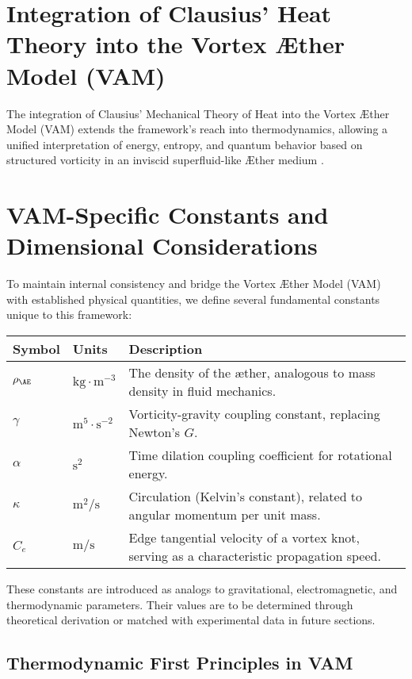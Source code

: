 

\section{Integration of Clausius' Heat Theory into the Vortex \AE ther Model (VAM)}

The integration of Clausius' Mechanical Theory of Heat into the Vortex \AE ther Model (VAM) extends the framework's reach into thermodynamics, allowing a unified interpretation of energy, entropy, and quantum behavior based on structured vorticity in an inviscid superfluid-like \AE ther medium \cite{clausius1865mechanical, maxwell1865electromagnetic, helmholtz1858integrals}.

\section{VAM-Specific Constants and Dimensional Considerations}

To maintain internal consistency and bridge the Vortex \AE ther Model (VAM) with established physical quantities, we define several fundamental constants unique to this framework:

\begin{tabular}{lll}
    \toprule
    Symbol & Units & Description \\
    \midrule
    $\rho_{\AE}$ & $\text{kg}\cdot\text{m}^{-3}$ & The density of the æther, analogous to mass density in fluid mechanics. \\
    $\gamma$ & $\text{m}^5 \cdot \text{s}^{-2}$ & Vorticity-gravity coupling constant, replacing Newton's $G$. \\
    $\alpha$ & $\text{s}^2$ & Time dilation coupling coefficient for rotational energy. \\
    $\kappa$ & $\text{m}^2/\text{s}$ & Circulation (Kelvin's constant), related to angular momentum per unit mass. \\
    $C_e$ & $\text{m}/\text{s}$ & Edge tangential velocity of a vortex knot, serving as a characteristic propagation speed. \\
    \bottomrule
\end{tabular}

These constants are introduced as analogs to gravitational, electromagnetic, and thermodynamic parameters. Their values are to be determined through theoretical derivation or matched with experimental data in future sections.

\subsection{Thermodynamic First Principles in VAM}

